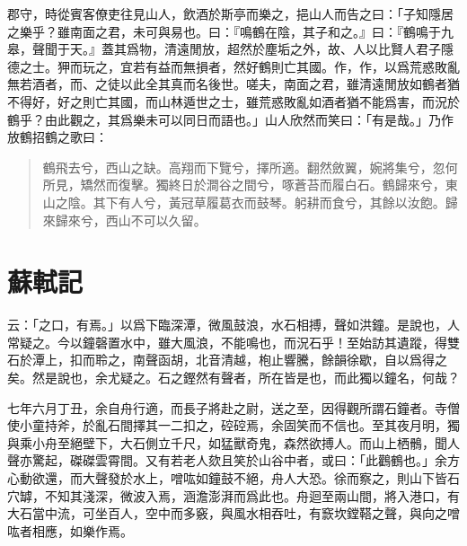 郡守，時從賓{客}僚吏往見山人，飲酒於斯亭而樂之，挹山人而告之曰：「子知隱居之樂乎？雖南面之君，未可與易也。曰：『鳴鶴在陰，其子和之。』曰：『鶴鳴于九皋，聲聞于天。』蓋其爲物，清遠閒放，超然於塵垢之外，故、人以比賢人君子隱德之士。狎而玩之，宜若有益而無損者，然好鶴則亡其國。作，作，以爲荒惑敗亂無若酒者，而、之徒以此全其真而名後世。嗟夫，南面之君，雖清遠閒放如鶴者猶不得好，好之則亡其國，而山林{遁}世之士，雖荒惑敗亂如酒者猶不能爲害，而況於鶴乎？由此觀之，其爲樂未可以同日而語也。」山人欣然而笑曰：「有是哉。」乃作放鶴招鶴之歌曰： %

\begin{quote}
    鶴飛去兮，西山之缺。高翔而下覽兮，擇所適。翻然斂翼，婉將集兮，忽何所見，矯然而復擊。獨終日於澗谷之間兮，啄蒼苔而履白石。鶴歸來兮，東山之陰。其下有人兮，黃冠草履葛衣而鼓琴。躬耕而食兮，其餘以汝飽。歸來歸來兮，西山不可以久留。
\end{quote}
\vspace{-1em}
\theendnotes

\section[石鐘山記\quad{\small 蘇軾}]{{\normalsize 蘇軾}\quad {}記}
云：「之口，有焉。」以爲下臨深潭，微風鼓浪，水石相搏，聲如洪鐘。是說也，人常疑之。今以鐘磬置水中，雖大風浪，不能鳴也，而況石乎！至始訪其遺蹤，得雙石於潭上，扣而聆之，南聲函胡，北音清越，枹止響騰，餘韻徐歇，自以爲得之矣。然是說也，余尤疑之。石之鏗然有聲者，所在皆是也，而此獨以鐘名，何哉？

七年六月丁丑，余自舟行適，而長子將赴之尉，送之至，因得觀所謂石鐘者。寺僧使小童持斧，於亂石間擇其一二扣之，硿硿{焉}，余固笑而不信也。至其夜月明，獨與乘小舟至絕壁下，大石側立千尺，如猛獸奇鬼，森然欲搏人。而山上栖鶻，聞人聲亦驚起，磔磔雲霄間。又有若老人欬且笑於山谷中者，或曰：「此鸛鶴也。」余方心動欲還，而大聲發於水上，噌吰如鐘鼓不絕，舟人大恐。徐而察之，則山下皆石穴罅，不知其淺深，微波入焉，涵澹澎湃而爲此也。舟迴至兩山間，將入港口，有大石當中流，可坐百人，空中而多竅，與風水相吞吐，有窾坎鏜鞳之聲，與向之噌吰者相應，如樂作焉。%

